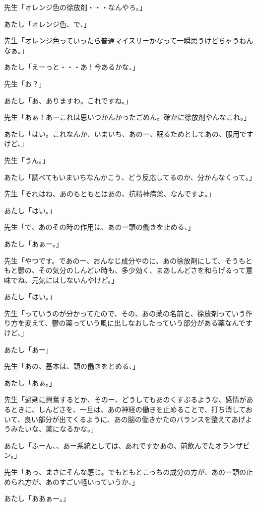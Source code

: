 \documentclass[b5j,twoside,twocolumn]{utarticle}
\begin{document}
\begin{description}
\item 先生「オレンジ色の徐放剤・・・なんやろ。」
\item あたし「オレンジ色、で、」
\item 先生「オレンジ色っていったら普通マイスリーかなって一瞬思うけどちゃうねんなぁ。」
\item あたし「えーっと・・・あ！今あるかな、」
\item 先生「お？」
\item あたし「あ、ありますわ。これですね。」
\item 先生「あぁ！あーこれは思いつかんかったごめん。確かに徐放剤やんなこれ。」
\item あたし「はい。これなんか、いまいち、あのー、眠るためとしてあの、服用ですけど、」
\item 先生「うん。」
\item あたし「調べてもいまいちなんかこう、どう反応してるのか、分かんなくって。」
\item 先生「それはね、あのもともとはあの、抗精神病薬、なんですよ。」
\item あたし「はい。」
\item 先生「で、あのその時の作用は、あのー頭の働きを止める、」
\item あたし「あぁー。」
\item 先生「やつです。であのー、おんなじ成分やのに、あの徐放剤にして、そうもともと鬱の、その気分のしんどい時も、多少効く、まあしんどさを和らげるって意味でね、元気にはしないんやけど。」
\item あたし「はい。」
\item 先生「っていうのが分かってたので、その、あの薬の名前と、徐放剤っていう作り方を変えて、鬱の薬っていう風に出しなおしたっていう部分がある薬なんですけど、」
\item あたし「あー」
\item 先生「あの、基本は、頭の働きをとめる、」
\item あたし「あぁ。」
\item 先生「過剰に興奮するとか、そのー、どうしてもあのくすぶるような、感情があるときに、しんどさを、一旦は、あの神経の働きを止めることで、打ち消しておいて、良い部分が出てくるように、あの脳の働きかたのバランスを整えてあげようみたいな、薬になるかな。」
\item あたし「ふーん、、あー系統としては、あれですかあの、前飲んでたオランザピン。」
\item 先生「あっ、まさにそんな感じ。でもともとこっちの成分の方が、あのー頭の止められ方が、あのすごい軽いっていうか、」
\item あたし「ああぁー。」

\end{description}
\end{document}

